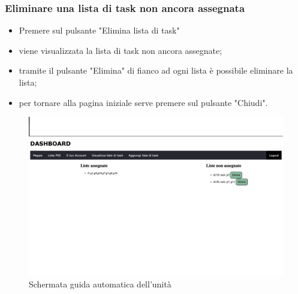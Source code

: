 \subsubsection{Eliminare una lista di task non ancora assegnata}
\begin{itemize}
    \item Premere sul pulsante "Elimina lista di task"
    \item viene visualizzata la lista di task non ancora assegnate;
    \item tramite il pulsante "Elimina" di fianco ad ogni lista è possibile eliminare la lista;
    \item per tornare alla pagina iniziale serve premere sul pulsante "Chiudi".
\end{itemize}
\begin{figure}[H]
    \centering
    \includegraphics[scale=0.12]{res/images/task_manager.png}
    \caption{Schermata guida automatica dell'unità}
\end{figure}